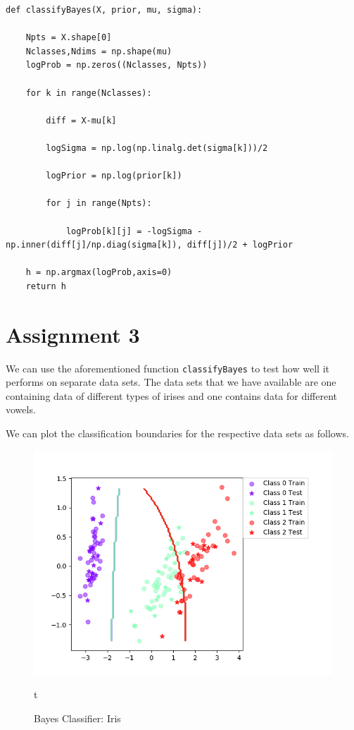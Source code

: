 \documentclass{article}
\begin{document}
\begin{lstlisting}
def classifyBayes(X, prior, mu, sigma):

    Npts = X.shape[0]
    Nclasses,Ndims = np.shape(mu)
    logProb = np.zeros((Nclasses, Npts))
    
    for k in range(Nclasses):
        
        diff = X-mu[k]
        
        logSigma = np.log(np.linalg.det(sigma[k]))/2
        
        logPrior = np.log(prior[k])
        
        for j in range(Npts):
            
            logProb[k][j] = -logSigma - np.inner(diff[j]/np.diag(sigma[k]), diff[j])/2 + logPrior

    h = np.argmax(logProb,axis=0)
    return h
\end{lstlisting}

\section*{Assignment 3}

We can use the aforementioned function \texttt{classifyBayes} to test how well it performs on separate data sets. The data sets that we have available are one containing data of different types of irises and one contains data for different vowels. 

We can plot the classification boundaries for the respective data sets as follows.

\begin{figure}
    \centering
    \includegraphics[scale = 0.90]{BayesIris.png}
    \caption{Bayes Classifier: Iris}
t\end{figure}
\end{document}
